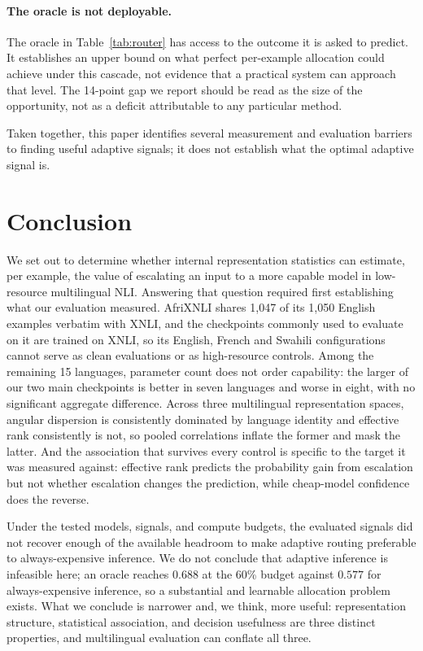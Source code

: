 \documentclass[11pt]{article}
\newcommand{\claim}[1]{#1}   %
\begin{document}
\paragraph{The oracle is not deployable.} The oracle in Table~\ref{tab:router}
has access to the outcome it is asked to predict. \claim{It establishes an upper
bound on what perfect per-example allocation could achieve under this cascade,
not evidence that a practical system can approach that level.} The 14-point gap
we report should be read as the size of the opportunity, not as a deficit
attributable to any particular method.

\claim{Taken together, this paper identifies several measurement and evaluation
barriers to finding useful adaptive signals; it does not establish what the
optimal adaptive signal is.}

\section{Conclusion}
\label{sec:conclusion}

We set out to determine whether internal representation statistics can estimate,
per example, the value of escalating an input to a more capable model in
low-resource multilingual NLI. Answering that question required first
establishing what our evaluation measured. AfriXNLI shares 1{,}047 of its 1{,}050
English examples verbatim with XNLI, and the checkpoints commonly used to
evaluate on it are trained on XNLI, so its English, French and Swahili
configurations cannot serve as clean evaluations or as high-resource controls.
Among the remaining 15 languages, parameter count does not order capability: the
larger of our two main checkpoints is better in seven languages and worse in
eight, with no significant aggregate difference. Across three multilingual
representation spaces, angular dispersion is consistently dominated by language
identity and effective rank consistently is not, so pooled correlations inflate
the former and mask the latter. And the association that survives every control
is specific to the target it was measured against: effective rank predicts the
probability gain from escalation but not whether escalation changes the
prediction, while cheap-model confidence does the reverse.

\claim{Under the tested models, signals, and compute budgets, the evaluated
signals did not recover enough of the available headroom to make adaptive routing
preferable to always-expensive inference.} We do not conclude that adaptive
inference is infeasible here; an oracle reaches $0.688$ at the 60\% budget
against $0.577$ for always-expensive inference, so a substantial and learnable
allocation problem exists. What we conclude is narrower and, we think, more
useful: \claim{representation structure, statistical association, and decision
usefulness are three distinct properties, and multilingual evaluation can
conflate all three.}
\end{document}
